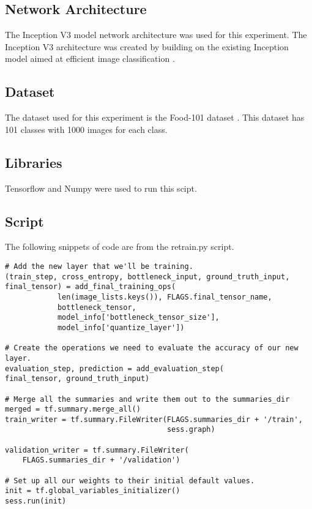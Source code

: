 \subsection*{Network Architecture}
The Inception V3 model network architecture was used for this experiment. The
Inception V3 architecture was created by building on the existing Inception
model aimed at efficient image classification \textcite{rethinkingInception}.

\subsection*{Dataset}
The dataset used for this experiment is the Food-101 dataset \textcite{Food
101}. This dataset has 101 classes with 1000 images for each class.

\subsection*{Libraries}
Tensorflow and Numpy were used to run this scipt.

\subsection*{Script}
The following snippets of code are from the retrain.py script.

\begin{lstlisting}
# Add the new layer that we'll be training.
(train_step, cross_entropy, bottleneck_input, ground_truth_input,
final_tensor) = add_final_training_ops(
            len(image_lists.keys()), FLAGS.final_tensor_name,
            bottleneck_tensor,
            model_info['bottleneck_tensor_size'],
            model_info['quantize_layer'])
 
# Create the operations we need to evaluate the accuracy of our new layer.
evaluation_step, prediction = add_evaluation_step(
final_tensor, ground_truth_input)
 
# Merge all the summaries and write them out to the summaries_dir
merged = tf.summary.merge_all()
train_writer = tf.summary.FileWriter(FLAGS.summaries_dir + '/train',
                                     sess.graph)
 
validation_writer = tf.summary.FileWriter(
    FLAGS.summaries_dir + '/validation')
 
# Set up all our weights to their initial default values.
init = tf.global_variables_initializer()
sess.run(init)

\end{lstlisting}




